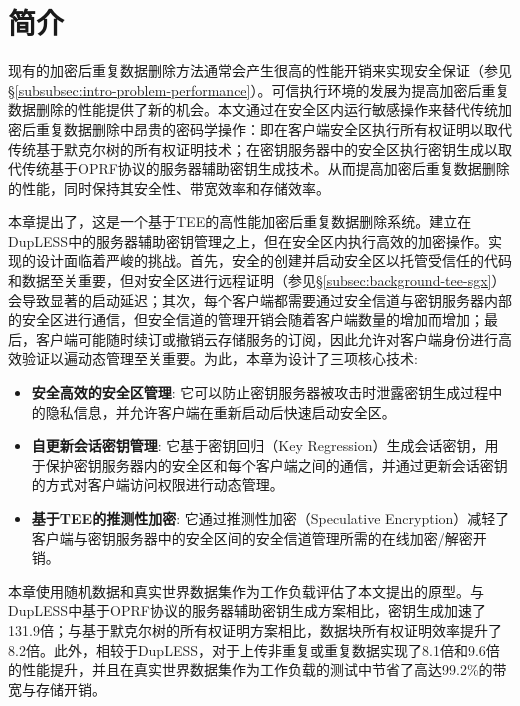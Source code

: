\section{简介}
\label{sec:sgxdedup-introduction}

现有的加密后重复数据删除方法通常会产生很高的性能开销来实现安全保证（参见\S\ref{subsubsec:intro-problem-performance}）。可信执行环境\cite{trustzone,sgx,MK-TME,AMDSEV}的发展为提高加密后重复数据删除的性能提供了新的机会。本文通过在安全区内运行敏感操作来替代传统加密后重复数据删除中昂贵的密码学操作：即在客户端安全区执行所有权证明以取代传统基于默克尔树的所有权证明技术；在密钥服务器中的安全区执行密钥生成以取代传统基于OPRF协议的服务器辅助密钥生成技术。从而提高加密后重复数据删除的性能，同时保持其安全性、带宽效率和存储效率。
 
本章提出了\sysnameS，这是一个基于TEE的高性能加密后重复数据删除系统。\sysnameS 建立在DupLESS\cite{bellare2013DupLESS}中的服务器辅助密钥管理之上，但在安全区内执行高效的加密操作。实现\sysnameS 的设计面临着严峻的挑战。首先，安全的创建并启动安全区以托管受信任的代码和数据至关重要，但对安全区进行远程证明（参见\S\ref{subsec:background-tee-sgx}）会导致显著的启动延迟；其次，每个客户端都需要通过安全信道与密钥服务器内部的安全区进行通信，但安全信道的管理开销会随着客户端数量的增加而增加；最后，客户端可能随时续订或撤销云存储服务的订阅，因此允许对客户端身份进行高效验证以遍动态管理至关重要。为此，本章为\sysnameS 设计了三项核心技术: 

\begin{itemize}[leftmargin=*]
    \item \textbf{安全高效的安全区管理}:
        它可以防止密钥服务器被攻击时泄露密钥生成过程中的隐私信息，并允许客户端在重新启动后快速启动安全区。
    \item \textbf{自更新会话密钥管理}:
        它基于密钥回归（Key Regression）\cite{fu06}生成会话密钥，用于保护密钥服务器内的安全区和每个客户端之间的通信，并通过更新会话密钥的方式对客户端访问权限进行动态管理。
    \item \textbf{基于TEE的推测性加密}:
        它通过推测性加密（Speculative Encryption）\cite{eduardo2019Speculative}减轻了客户端与密钥服务器中的安全区间的安全信道管理所需的在线加密/解密开销。
\end{itemize}

本章使用随机数据和真实世界数据集\cite{fsl,meyer2011deduplication}作为工作负载评估了本文提出的\sysnameS 原型。与DupLESS\cite{bellare2013DupLESS}中基于OPRF协议的服务器辅助密钥生成方案相比，密钥生成加速了131.9倍；与基于默克尔树的所有权证明方案\cite{halevi11}相比，数据块所有权证明效率提升了8.2倍。此外，相较于DupLESS\cite{bellare2013DupLESS}，\sysnameS 对于上传非重复或重复数据实现了8.1倍和9.6倍的性能提升，并且在真实世界数据集作为工作负载的测试中节省了高达99.2\%的带宽与存储开销。

